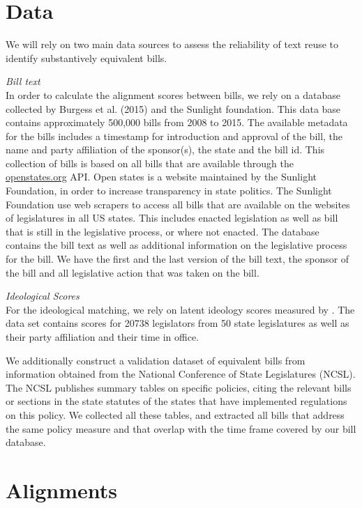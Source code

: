 \documentclass[12pt]{article} %
\begin{document}
\section{Data}

We will rely on two main data sources to assess the reliability of text reuse to
identify substantively equivalent bills. 

\textit{Bill text}\\
In order to calculate the alignment scores between bills, we rely on a database collected by Burgess et al. (2015) and the Sunlight foundation. This data base contains approximately 500,000 bills from 2008 to 2015. The available metadata for the bills includes a timestamp for introduction and approval of the bill, the name and party affiliation of the sponsor(s), the state and the bill id.  This collection of bills is based on all bills that are available through the \url{openstates.org} API. Open states is a website maintained by the Sunlight Foundation, in order to increase transparency in state politics. The Sunlight Foundation use web scrapers to access all bills that are available on the websites of legislatures in all US states. This includes enacted legislation as well as bill that is still in the legislative process, or where not enacted. The database contains the bill text as well as additional information on the legislative process for the bill. We have the first and the last version of the bill text, the sponsor of the bill and all legislative action that was taken on the bill. 

\textit{Ideological Scores}\\
For the ideological matching, we rely on latent ideology scores measured by \citep{shor2011}. The data set contains scores for 20738 legislators from 50 state legislatures as well as their party affiliation and their time in office. 

We additionally construct a validation dataset of equivalent bills from information obtained from the National Conference of State Legislatures (NCSL). The NCSL publishes summary tables on specific policies, citing the relevant bills or sections in the state statutes of the states that have implemented regulations on this policy. We collected all these tables, and extracted all bills that address the same policy measure and that overlap with the time frame covered by our bill database.


\section{Alignments}
\end{document}
